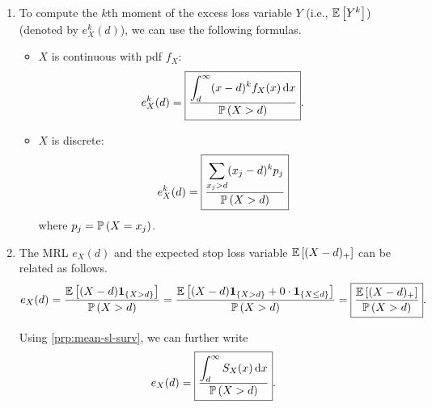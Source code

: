 \begin{enumerate}
\item \label{it:ex-loss-kth-moment-fmlas}
To compute the \(k\)th moment of the excess loss variable \(Y\) (i.e.,
\(\mathbb{E}\left[Y^k\right]\)) (denoted by \(e_X^{k}(d)\)), we can use the following formulas.
\begin{itemize}
\item \(X\) is continuous with pdf \(f_X\):
\[
e_X^{k}(d)=\boxed{\frac{\displaystyle \int_{d}^{\infty}(x-d)^kf_X(x)\dd{x}}{\mathbb{P}\left(X>d\right)}}.
\]
\item \(X\) is discrete:
\[
e_X^{k}(d)=\boxed{\frac{\displaystyle \sum_{x_j>d}^{}(x_j-d)^{k}p_j}{\mathbb{P}\left(X>d\right)}}
\]
where \(p_j=\mathbb{P}\left(X=x_j\right)\).
\end{itemize}
\item \label{it:mrl-exp-sl-relation}
The MRL \(e_X(d)\) and the expected stop loss variable \(\mathbb{E}\left[(X-d)_{+}\right]\) can
be related as follows.
\[
e_X(d)=\frac{\mathbb{E}\left[(X-d)\mathbf{1}_{\left\{X>d\right\}}\right]}{\mathbb{P}\left(X>d\right)}
=\frac{\mathbb{E}\left[(X-d)\mathbf{1}_{\left\{X>d\right\}}+0\cdot\mathbf{1}_{\left\{X\le d\right\}}\right]}{\mathbb{P}\left(X>d\right)}
=\boxed{\frac{\mathbb{E}\left[(X-d)_{+}\right]}{\mathbb{P}\left(X>d\right)}}.
\]
\begin{note}
Using \cref{prp:mean-sl-surv}, we can further write
\[
e_X(d)=\boxed{\frac{\displaystyle \int_{d}^{\infty}S_X(x)\dd{x}}{\mathbb{P}\left(X>d\right)}}.
\]
\end{note}
\end{enumerate}
